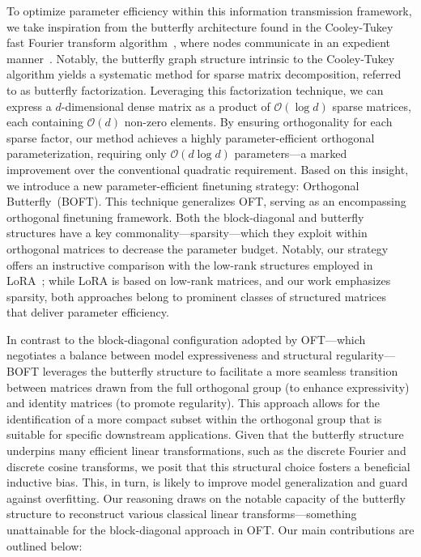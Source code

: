 To optimize parameter efficiency within this information transmission framework, we take inspiration from the butterfly architecture found in the Cooley-Tukey fast Fourier transform algorithm~\cite{cooley1965algorithm}, where nodes communicate in an expedient manner~\cite{klasing1994broadcasting}. Notably, the butterfly graph structure intrinsic to the Cooley-Tukey algorithm yields a systematic method for sparse matrix decomposition, referred to as butterfly factorization. Leveraging this factorization technique, we can express a $d$-dimensional dense matrix as a product of $\mathcal{O}(\log d)$ sparse matrices, each containing $\mathcal{O}(d)$ non-zero elements. By ensuring orthogonality for each sparse factor, our method achieves a highly parameter-efficient orthogonal parameterization, requiring only $\mathcal{O}(d\log d)$ parameters—a marked improvement over the conventional quadratic requirement. Based on this insight, we introduce a new parameter-efficient finetuning strategy: Orthogonal Butterfly~(BOFT). This technique generalizes OFT, serving as an encompassing orthogonal finetuning framework. Both the block-diagonal and butterfly structures have a key commonality—sparsity—which they exploit within orthogonal matrices to decrease the parameter budget. Notably, our strategy offers an instructive comparison with the low-rank structures employed in LoRA~\cite{hulora2022}; while LoRA is based on low-rank matrices, and our work emphasizes sparsity, both approaches belong to prominent classes of structured matrices~\cite{candes2011robust} that deliver parameter efficiency.

In contrast to the block-diagonal configuration adopted by OFT—which negotiates a balance between model expressiveness and structural regularity—BOFT leverages the butterfly structure to facilitate a more seamless transition between matrices drawn from the full orthogonal group (to enhance expressivity) and identity matrices (to promote regularity). This approach allows for the identification of a more compact subset within the orthogonal group that is suitable for specific downstream applications. Given that the butterfly structure underpins many efficient linear transformations, such as the discrete Fourier and discrete cosine transforms, we posit that this structural choice fosters a beneficial inductive bias. This, in turn, is likely to improve model generalization and guard against overfitting. Our reasoning draws on the notable capacity of the butterfly structure to reconstruct various classical linear transforms—something unattainable for the block-diagonal approach in OFT. Our main contributions are outlined below:

